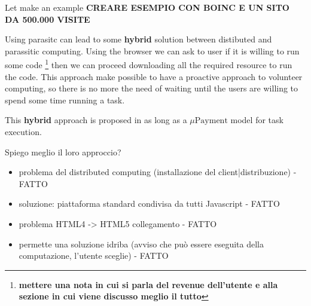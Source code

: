 Let make an example \textbf{CREARE ESEMPIO CON BOINC E UN SITO DA 500.000 VISITE}

Using parasitc \js{} can lead to some \textbf{hybrid} solution between distibuted and
parassitic computing. Using the browser we can ask to user if it is willing to run some code
\footnote{\textbf{mettere una nota in cui si parla del revenue dell'utente e alla sezione in cui viene discusso
meglio il tutto}} then we can proceed downloading all the required resource to run the code.
This approach make possible to have a proactive approach to volunteer computing, so there is no more the
need of waiting until the users are willing to spend some time running a task.

This \textbf{hybrid} approach is proposed in \cite{karame2011pay} as long as a $\mu\textrm{Payment}$ model
for task execution.

Spiego meglio il loro approccio?

\begin{itemize}
	\item problema del distributed computing (installazione del client|distribuzione) - FATTO
	\item soluzione: piattaforma standard condivisa da tutti Javascript - FATTO
	\item problema HTML4 -> HTML5 collegamento - FATTO
	\item permette una soluzione idriba (avviso che può essere eseguita della computazione, l'utente sceglie) - FATTO
\end{itemize}